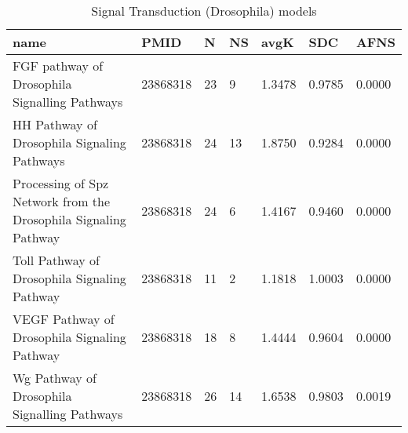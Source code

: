 \begin{table}
\centering
\caption{Signal Transduction (Drosophila) models}
\label{tab:Signal_Transduction_(Drosophila)}
\begin{tabular}{|p{180pt}||p{40pt}|p{25pt}|p{25pt}|p{40pt}|p{25pt}|p{25pt}|}
\toprule
name & PMID &N &NS & avgK &SDC & AFNS \\
\midrule
FGF pathway of Drosophila Signalling Pathways & 23868318 & 23 & 9 & 1.3478 & 0.9785 & 0.0000 \\
HH Pathway of Drosophila Signaling Pathways & 23868318 & 24 &13 & 1.8750 & 0.9284 & 0.0000 \\
Processing of Spz Network from the Drosophila Signaling Pathway & 23868318 & 24 & 6 & 1.4167 & 0.9460 & 0.0000 \\
Toll Pathway of Drosophila Signaling Pathway & 23868318 & 11 & 2 & 1.1818 & 1.0003 & 0.0000 \\
VEGF Pathway of Drosophila Signaling Pathway & 23868318 & 18 & 8 & 1.4444 & 0.9604 & 0.0000 \\
Wg Pathway of Drosophila Signalling Pathways & 23868318 & 26 &14 & 1.6538 & 0.9803 & 0.0019 \\
\bottomrule
\end{tabular}
\end{table}
